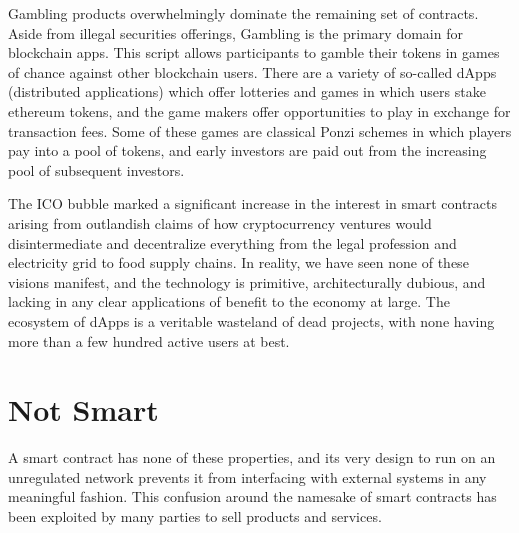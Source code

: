 
Gambling products overwhelmingly dominate the remaining set of contracts. Aside
from illegal securities offerings, Gambling is the primary domain for blockchain
apps. This script allows participants to gamble their tokens in games of chance
against other blockchain users. There are a variety of so-called dApps
(distributed applications) which offer lotteries and games in which users stake
ethereum tokens, and the game makers offer opportunities to play in exchange for
transaction fees. Some of these games are classical Ponzi schemes in which
players pay into a pool of tokens, and early investors are paid out from the
increasing pool of subsequent investors. \cite{pinna2019massive, hartel2019empirical}

The ICO bubble marked a significant increase in the interest in smart contracts
arising from outlandish claims of how cryptocurrency ventures would
disintermediate and decentralize everything from the legal profession and
electricity grid to food supply chains. In reality, we have seen none of these
visions manifest, and the technology is primitive, architecturally dubious, and
lacking in any clear applications of benefit to the economy at large. The
ecosystem of dApps is a veritable wasteland of dead projects, with none having
more than a few hundred active users at best.

\section{Not Smart}

A smart contract has none of these properties, and its very design to run on an
unregulated network prevents it from interfacing with external systems in any
meaningful fashion. This confusion around the namesake of smart contracts has
been exploited by many parties to sell products and services.

